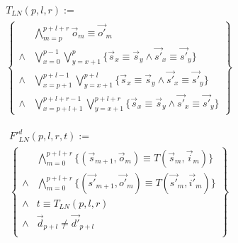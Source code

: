 \documentclass[conference]{IEEEtran}
\begin{document}
\begin{multline}\label{tln}
T_{LN}(p,l,r):=\\
\left\{
\begin{array}{cc}
      &\bigwedge_{m=p}^{p+l+r}\vec{o}_m\equiv \vec{o'}_m \\
\wedge&\bigvee_{x=0}^{p-1}\bigvee_{y=x+1}^{p} \{\vec{s}_x\equiv \vec{s}_y\wedge \vec{s'}_x\equiv \vec{s'}_y\} \\
\wedge&\bigvee_{x=p+1}^{p+l-1}\bigvee_{y=x+1}^{p+l} \{\vec{s}_x\equiv \vec{s}_y\wedge \vec{s'}_x\equiv \vec{s'}_y\} \\
\wedge&\bigvee_{x=p+l+1}^{p+l+r-1}\bigvee_{y=x+1}^{p+l+r} \{\vec{s}_x\equiv \vec{s}_y\wedge \vec{s'}_x\equiv \vec{s'}_y\}
\end{array}
\right\}
\end{multline}


\begin{multline}\label{lndef1}
F'^d_{LN}(p,l,r,t):=\\
\left\{
\begin{array}{cc}
&\bigwedge_{m=0}^{p+l+r}
\{
(\vec{s}_{m+1},\vec{o}_m)\equiv T(\vec{s}_m,\vec{i}_m)
\}
\\
\wedge&\bigwedge_{m=0}^{p+l+r}
\{
(\vec{s'}_{m+1},\vec{o'}_m)\equiv T(\vec{s'}_m,\vec{i'}_m)
\}
\\
\wedge& t\equiv T_{LN}(p,l,r)\\
\wedge& \vec{d}_{p+l}\ne \vec{d'}_{p+l} \\
\end{array}
\right\}
\end{multline}

\end{document}
